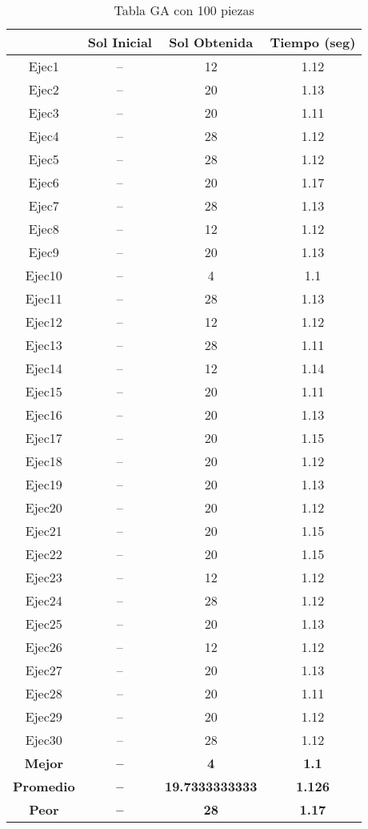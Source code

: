 \begin{center}
\begin{table}
\end{table}

\begin{table}

\begin{tabular}{|c|c|c|c|}
\hline
 & {\bf Sol Inicial} & {\bf Sol Obtenida} & {\bf Tiempo (seg)} \\
\hline
Ejec1 & -- & 12  & 1.12 \\
\hline
Ejec2 & -- & 20  & 1.13 \\
\hline
Ejec3 & -- & 20  & 1.11 \\
\hline
Ejec4 & -- & 28  & 1.12 \\
\hline
Ejec5 & -- & 28  & 1.12 \\
\hline
Ejec6 & -- & 20  & 1.17 \\
\hline
Ejec7 & -- & 28  & 1.13 \\
\hline
Ejec8 & -- & 12  & 1.12 \\
\hline
Ejec9 & -- & 20  & 1.13 \\
\hline
Ejec10 & -- & 4  & 1.1 \\
\hline
Ejec11 & -- & 28  & 1.13 \\
\hline
Ejec12 & -- & 12  & 1.12 \\
\hline
Ejec13 & -- & 28  & 1.11 \\
\hline
Ejec14 & -- & 12  & 1.14 \\
\hline
Ejec15 & -- & 20  & 1.11 \\
\hline
Ejec16 & -- & 20  & 1.13 \\
\hline
Ejec17 & -- & 20  & 1.15 \\
\hline
Ejec18 & -- & 20  & 1.12 \\
\hline
Ejec19 & -- & 20  & 1.13 \\
\hline
Ejec20 & -- & 20  & 1.12 \\
\hline
Ejec21 & -- & 20  & 1.15 \\
\hline
Ejec22 & -- & 20  & 1.15 \\
\hline
Ejec23 & -- & 12  & 1.12 \\
\hline
Ejec24 & -- & 28  & 1.12 \\
\hline
Ejec25 & -- & 20  & 1.13 \\
\hline
Ejec26 & -- & 12  & 1.12 \\
\hline
Ejec27 & -- & 20  & 1.13 \\
\hline
Ejec28 & -- & 20  & 1.11 \\
\hline
Ejec29 & -- & 20  & 1.12 \\
\hline
Ejec30 & -- & 28  & 1.12 \\
\hline
{\bf Mejor} & {\bf -- } & {\bf 4} & {\bf 1.1} \\
\hline
{\bf Promedio} & {\bf -- } & {\bf 19.7333333333} & {\bf 1.126} \\
\hline
{\bf Peor} & {\bf -- } & {\bf 28} & {\bf 1.17} \\
\hline
\end{tabular}
\caption{Tabla GA con 100 piezas}


\end{table}
\end{center}
